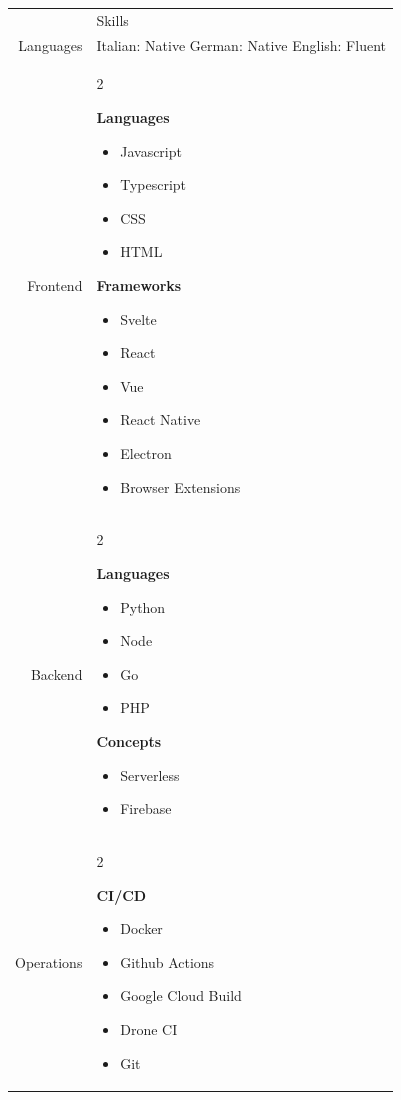 \documentclass[letterpaper,12pt]{article}
\newcommand{\headingfont}{\Large\color{accent}\BluuNext}
\newenvironment{compactlist}{
  \begin{itemize}[noitemsep,nolistsep,partopsep=-20pt,topsep=-20pt,leftmargin=0pt, label=--]
      }{
  \end{itemize}
}
\newenvironment{lr}{
  \setlength\multicolsep{-1.7em}
  \begin{multicols}{2}
}{
  \end{multicols}
}
\newenvironment{SectionTable}[1]{
	\renewcommand*{\arraystretch}{1.7}
	\setlength{\tabcolsep}{10pt}
	\begin{longtable}{Rp{5.2in}} & #1 \\}
{\end{longtable}\vspace{-.3cm}}
\begin{document}
\begin{SectionTable}{\headingfont Skills}

  Languages &
  Italian: Native \newline
  German: Native \newline
  English: Fluent \newline
  \\

  Frontend &
  \begin{lr}
    \textbf{Languages}
    \begin{compactlist}
      \item Javascript
      \item Typescript
      \item CSS
      \item HTML
    \end{compactlist}

    \columnbreak

    \textbf{Frameworks}
    \begin{compactlist}
      \item Svelte
      \item React
      \item Vue
      \item React Native
      \item Electron
      \item Browser Extensions
    \end{compactlist}
  \end{lr}
  \\

  Backend &
  \begin{lr}
    \textbf{Languages}
    \begin{compactlist}
      \item Python
      \item Node
      \item Go
      \item PHP
    \end{compactlist}
    \columnbreak
    \textbf{Concepts}
    \begin{compactlist}
      \item Serverless
      \item Firebase
    \end{compactlist}
  \end{lr}
  \\

  Operations &
  \begin{lr}
    \textbf{CI/CD}
    \begin{compactlist}
      \item Docker
      \item Github Actions
      \item Google Cloud Build
      \item Drone CI
      \item Git
    \end{compactlist}


\end{lr}
\end{SectionTable}
\end{document}
